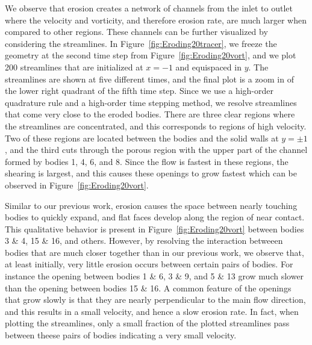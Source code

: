 \documentclass[preprint,10pt]{elsarticle}
\begin{document}
We observe that erosion creates a network of channels from the inlet to
outlet where the velocity and vorticity, and therefore erosion rate, are
much larger when compared to other regions.  These channels can be
further visualized by considering the streamlines.  In
Figure~\ref{fig:Eroding20tracer}, we freeze the geometry at the second
time step from Figure~\ref{fig:Eroding20vort}, and we plot 200
streamlines that are initialized at $x=-1$ and equispaced in $y$.  The
streamlines are shown at five different times, and the final plot is a
zoom in of the lower right quadrant of the fifth time step.  Since we
use a high-order quadrature rule and a high-order time stepping method,
we resolve streamlines that come very close to the eroded bodies.  There
are three clear regions where the streamlines are concentrated, and this
corresponds to regions of high velocity.  Two of these regions are
located between the bodies and the solid walls at $y=\pm 1$, and the
third cuts through the porous region with the upper part of the channel
formed by bodies 1, 4, 6, and 8.  Since the flow is fastest in these
regions, the shearing is largest, and this causes these openings to grow
fastest which can be observed in Figure~\ref{fig:Eroding20vort}.  

Similar to our previous work, erosion causes the space between nearly
touching bodies to quickly expand, and flat faces develop along the
region of near contact.  This qualitative behavior is present in
Figure~\ref{fig:Eroding20vort} between bodies 3 \& 4, 15 \& 16, and
others.  However, by resolving the interaction betweeen bodies that are
much closer together than in our previous work, we observe that, at
least initially, very little erosion occurs between certain pairs of
bodies.  For instance the opening between bodies 1 \& 6, 3 \& 9, and 5
\& 13 grow much slower than the opening between bodies 15 \& 16.  A
common feature of the openings that grow slowly is that they are nearly
perpendicular to the main flow direction, and this results in a small
velocity, and hence a slow erosion rate.  In fact, when plotting the
streamlines, only a small fraction of the plotted streamlines pass
between theese pairs of bodies indicating a very small velocity.
\end{document}
